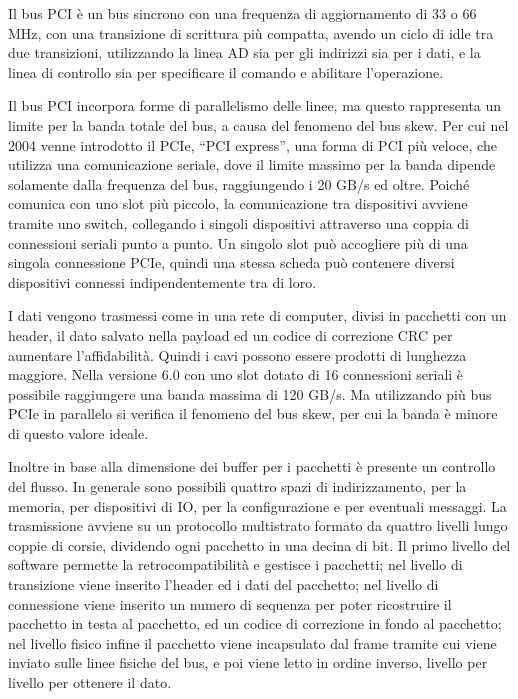 \documentclass{article}
\numberwithin{equation}{subsection}
\begin{document}
Il bus PCI è un bus sincrono con una frequenza di aggiornamento di 33 o 66 MHz, con una transizione di scrittura più compatta, avendo un ciclo di idle tra due transizioni, utilizzando la 
linea AD sia per gli indirizzi sia per i dati, e la linea di controllo sia per specificare il comando e abilitare l'operazione. 

Il bus PCI incorpora forme di parallelismo delle linee, ma questo rappresenta un limite per la banda totale del bus, a causa del fenomeno del bus skew. Per cui nel 2004 venne introdotto 
il PCIe, ``PCI express'', una forma di PCI più veloce, che utilizza una comunicazione seriale, dove il limite massimo per la banda dipende solamente dalla frequenza del bus, raggiungendo 
i 20 GB/s ed oltre. Poiché comunica con uno slot più piccolo, la comunicazione tra dispositivi avviene tramite uno switch, collegando i singoli dispositivi attraverso una coppia di 
connessioni seriali punto a punto. 
Un singolo slot può accogliere più di una singola connessione PCIe, quindi una stessa scheda può contenere diversi dispositivi connessi indipendentemente tra di loro. 

I dati vengono trasmessi come in una rete di computer, divisi in pacchetti con un header, il dato salvato nella payload ed un codice di correzione CRC per aumentare l'affidabilità. 
Quindi i cavi possono essere prodotti di lunghezza maggiore. Nella versione 6.0 con uno slot dotato di 16 connessioni seriali è possibile raggiungere una banda massima di 120 GB/s. Ma 
utilizzando più bus PCIe in parallelo si verifica il fenomeno del bus skew, per cui la banda è minore di questo valore ideale. 

Inoltre in base alla dimensione dei buffer per i pacchetti è presente un controllo del flusso. In generale sono possibili quattro spazi di indirizzamento, per la memoria, per dispositivi di IO, 
per la configurazione e per eventuali messaggi. 
La trasmissione avviene su un protocollo multistrato formato da quattro livelli lungo coppie di corsie, dividendo ogni pacchetto in una decina di bit. Il primo livello del software permette 
la retrocompatibilità e gestisce i pacchetti; nel livello di transizione viene inserito l'header ed i dati del pacchetto; nel livello di connessione viene inserito un numero di sequenza per 
poter ricostruire il pacchetto in testa al pacchetto, ed un codice di correzione in fondo al pacchetto; nel livello fisico infine il pacchetto viene incapsulato dal frame tramite cui viene 
inviato sulle linee fisiche del bus, e poi viene letto in ordine inverso, livello per livello per ottenere il dato. 
\end{document}
